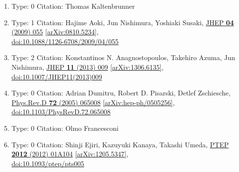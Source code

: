 \documentclass[a4paper,10pt]{article}
\begin{document}
\begin{enumerate}
\begin{enumerate}
  \item Type: 0 Citation: Thomas Kaltenbrunner
  \item Type: 1 Citation: Hajime Aoki, Jun Nishimura, Yoshiaki Susaki, \href{https://www.doi.org/10.1088/1126-6708/2009/04/055}{JHEP {\bf 04} (2009) 055}  \href{https://arxiv.org/abs/0810.5234}{[arXiv:0810.5234]},\\\href{https://www.doi.org/10.1088/1126-6708/2009/04/055}{doi:10.1088/1126-6708/2009/04/055}
  \item Type: 2 Citation: Konstantinos N. Anagnostopoulos, Takehiro Azuma, Jun Nishimura, \href{https://www.doi.org/10.1007/JHEP11(2013)009}{JHEP {\bf 11} (2013) 009}  \href{https://arxiv.org/abs/1306.6135}{[arXiv:1306.6135]},\\\href{https://www.doi.org/10.1007/JHEP11(2013)009}{doi:10.1007/JHEP11(2013)009}
  \item Type: 0 Citation: Adrian Dumitru, Robert D. Pisarski, Detlef Zschiesche, \href{https://www.doi.org/10.1103/PhysRevD.72.065008}{Phys.Rev.D {\bf 72} (2005) 065008}  \href{https://arxiv.org/abs/hep-ph/0505256}{[arXiv:hep-ph/0505256]},\\\href{https://www.doi.org/10.1103/PhysRevD.72.065008}{doi:10.1103/PhysRevD.72.065008}
  \item Type: 0 Citation: Olmo Francesconi
  \item Type: 0 Citation: Shinji Ejiri, Kazuyuki Kanaya, Takashi Umeda, \href{https://www.doi.org/10.1093/ptep/pts005}{PTEP {\bf 2012} (2012) 01A104}  \href{https://arxiv.org/abs/1205.5347}{[arXiv:1205.5347]},\\\href{https://www.doi.org/10.1093/ptep/pts005}{doi:10.1093/ptep/pts005}

\end{enumerate}
\end{enumerate}
\end{document}
